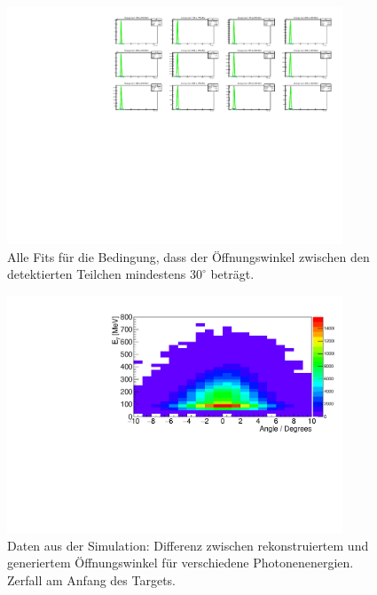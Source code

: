 \documentclass[a4paper,11pt,oneside,final,german,openbib,pdftex]{scrbook}
\begin{document}
{\begin{appendix}
\begin{figure}[h!]
	\begin{center}
		\includegraphics[width=100mm]{NewCalib/20171904SimMinOpeningAngleAllFits}
		\caption[Simulation: \"Offnungswinkel $>$ 30$^{\circ}$ alle Fits]{Alle Fits f\"ur die Bedingung, dass der \"Offnungswinkel zwischen den detektierten Teilchen mindestens $30^{\circ}$ betr\"agt.}
		\label{fig:Relative-Abweichung-Min-Opening-Angle-AllFits}
	\end{center}
\end{figure}


\begin{figure}[h!]
	\begin{center}
		\includegraphics[width=100mm]{OeffZVertex/20170205DiffOeffZVertex-4}
		\caption[Simulation: Differenz zwischen rek. und gen. \"Offnungswinkel: Zerfall am Anfang des Targets]{Daten aus der Simulation: Differenz zwischen rekonstruiertem und generiertem \"Offnungswinkel f\"ur verschiedene Photonenenergien. Zerfall am Anfang des Targets.}
		\label{fig:OeffZVertex-4}
	
	\end{center}
\end{figure}


\end{appendix}}
\end{document}
